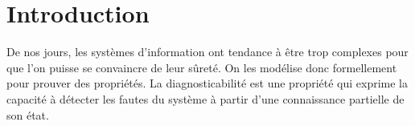 \documentclass[conference]{IEEEtran}
\begin{document}
\begin{abstract}
La notion classique de diagnosticabilit\'e ne permet de mod\'eliser que des fautes permanentes, et le langage des fautes est donc suppos\'e suffixe-clos. Dans ce papier, nous rel\^achons cette hypoth\`ese afin de permettre la mod\'elisation de fautes r\'eparables. Pour ce faire, nous introduisons la T-diagnosticabilit\'e qui formalise le fait que toute faute est d\'etect\'ee en temps born\'e et avant d'\^etre r\'epar\'ee.

Nous montrons que la T-diagnosticabilit\'e \'etend bien la notion de diagnosticabilit\'e, c'est-\`a-dire que pour un syst\`eme dont les fautes sont permanentes, les notions de T-diagnosticabilit\'e et de diagnosticabilit\'e coincident.

Nous proposons un algorithme de d\'ecision PSPACE pour la T-diagnosticabilit\'e et une construction de R-diagnostiqueur.
\end{abstract}





%
\IEEEpeerreviewmaketitle



\section{Introduction}
De nos jours, les syst\`emes d'information ont tendance \`a \^etre trop complexes pour que l'on puisse se convaincre de leur sûret\'e. On les mod\'elise donc formellement pour prouver des propriétés. La diagnosticabilit\'e est une propri\'et\'e qui exprime la capacit\'e \`a d\'etecter les fautes du syst\`eme \`a partir d'une connaissance partielle de son \'etat.
\end{document}
